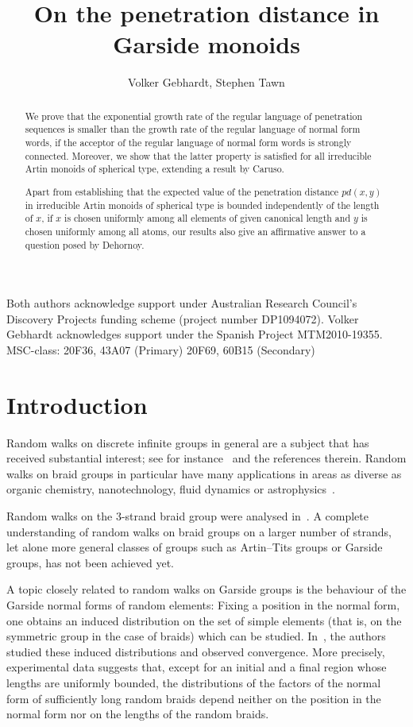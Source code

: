 \documentclass[a4paper,final]{article}
\title{On the penetration distance in Garside monoids}
\author{{{Volker Gebhardt}}, {{Stephen Tawn}}}
\theoremstyle{plain}
\theoremstyle{remark}
\theoremstyle{definition}
\begin{document}
\maketitle
{\xdef\@thefnmark{}\@footnotetext}{Both authors acknowledge support under Australian Research Council's Discovery Projects funding scheme (project number DP1094072). Volker Gebhardt acknowledges support under the Spanish Project MTM2010-19355.}
{\xdef\@thefnmark{}\@footnotetext}{MSC-class: 20F36, 43A07 (Primary) 20F69, 60B15 (Secondary)}

\begin{abstract}
We prove that the exponential growth rate of the regular language of
penetration sequences is smaller than the growth rate of the regular language
of normal form words, if the acceptor of the regular language of normal form
words is strongly connected.
Moreover, we show that the latter property is satisfied for all irreducible
Artin monoids of spherical type, extending a result by Caruso.

   Apart from establishing that the expected value of the penetration distance
$pd(x,y)$ in irreducible Artin monoids of spherical type is bounded
independently of the length of $x$, if $x$ is chosen uniformly among all
elements of given canonical length and $y$ is chosen uniformly among all
atoms, our results also give an affirmative answer to a question posed by
Dehornoy.
\end{abstract}

\section{Introduction}

Random walks on discrete infinite groups in general are a subject that has received substantial interest; see for instance~\cite{KaimanovichVershik,Woess2000} and the references therein.
Random walks on braid groups in particular have many applications in areas as diverse as organic chemistry, nanotechnology, fluid dynamics or astrophysics~\cite{MR1246471,MR1434066,Woess2000,MR1891810}.

Random walks on the 3-strand braid group were analysed in~\cite{MairesseMatheus}.
A complete understanding of random walks on braid groups on a larger number of strands, let alone more general classes of groups such as Artin--Tits groups or Garside groups, has not been achieved yet.
\medskip

A topic closely related to random walks on Garside groups is the behaviour of the Garside normal forms of random elements:  Fixing a position in the normal form, one obtains an induced distribution on the set of simple elements (that is, on the symmetric group in the case of braids) which can be studied.
In~\cite{GT13}, the authors studied these induced distributions and observed convergence.
More precisely, experimental data suggests that, except for an initial and a final region whose lengths are uniformly bounded, the distributions of the factors of the normal form of sufficiently long random braids depend neither on the position in the normal form nor on the lengths of the random braids.
\end{document}
